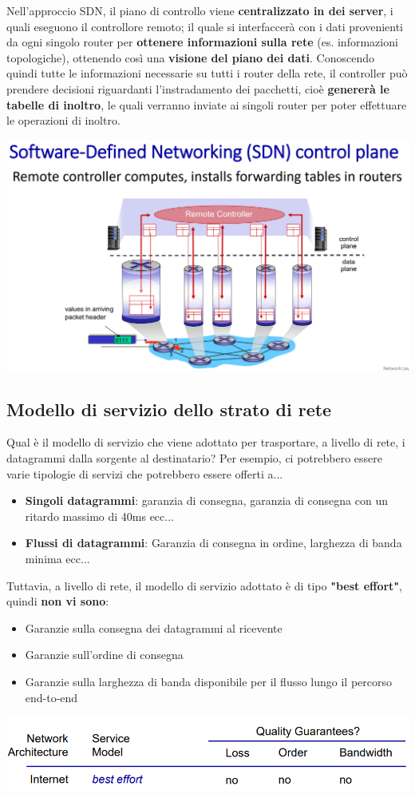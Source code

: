 \documentclass[12pt]{article}
\begin{document}
Nell'approccio SDN, il piano di controllo viene \textbf{centralizzato in dei server}, i quali eseguono il controllore remoto; il quale si
interfaccerà con i dati provenienti da ogni singolo router per \textbf{ottenere informazioni sulla rete} (es. informazioni topologiche), ottenendo
così una \textbf{visione del piano dei dati}. Conoscendo quindi tutte le informazioni necessarie su tutti i router della rete, il controller può prendere
decisioni riguardanti l'instradamento dei pacchetti, cioè \textbf{genererà le tabelle di inoltro}, le quali verranno inviate ai singoli router per poter effettuare le operazioni di inoltro.
\begin{center}
    \includegraphics[width = 0.80\linewidth]{Images/75.png}
\end{center}
\subsection{Modello di servizio dello strato di rete}
Qual è il modello di servizio che viene adottato per trasportare, a livello di rete, i datagrammi dalla sorgente al destinatario?
Per esempio, ci potrebbero essere varie tipologie di servizi che potrebbero essere offerti a... 
\begin{itemize}
    \item \textbf{Singoli datagrammi}: garanzia di consegna, garanzia di consegna con un ritardo massimo di 40ms ecc...
    \item \textbf{Flussi di datagrammi}: Garanzia di consegna in ordine, larghezza di banda minima ecc...
\end{itemize}
Tuttavia, a livello di rete, il modello di servizio adottato è di tipo \textbf{"best effort"}, quindi \textbf{non vi sono}:
\begin{itemize}
    \item Garanzie sulla consegna dei datagrammi al ricevente
    \item Garanzie sull'ordine di consegna
    \item Garanzie sulla larghezza di banda disponibile per il flusso lungo il percorso end-to-end
\end{itemize}
\begin{center}
    \includegraphics[width = 0.80\linewidth]{Images/76.png}
\end{center}
\end{document}
